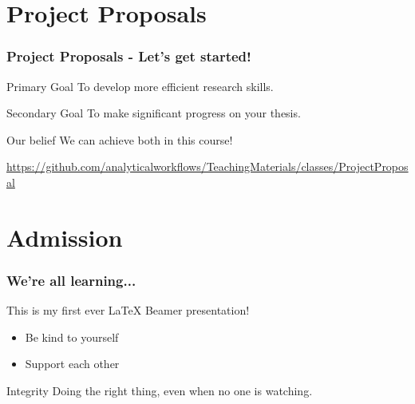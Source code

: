 \documentclass{beamer}
\begin{document}

\section{Project Proposals}


\begin{frame}
    \frametitle{Project Proposals - Let's get started!}

    \begin{block}{Primary Goal}
        To develop more efficient research skills.
    \end{block}

    \begin{block}{Secondary Goal}
        To make significant progress on your thesis.
    \end{block}

    \begin{block}{Our belief}
        We can achieve both in this course!
    \end{block}

    \url{https://github.com/analyticalworkflows/TeachingMaterials/classes/ProjectProposal}

\end{frame}


\section{Admission}


\begin{frame}
    \frametitle{We're all learning...}

    This is my first ever \LaTeX{} Beamer presentation!

    \bigskip

    \begin{itemize}
        \item Be kind to yourself
        \item Support each other
    \end{itemize}

    \begin{block}{Integrity}
      Doing the right thing, even when no one is watching.
    \end{block}

\end{frame}
\end{document}
